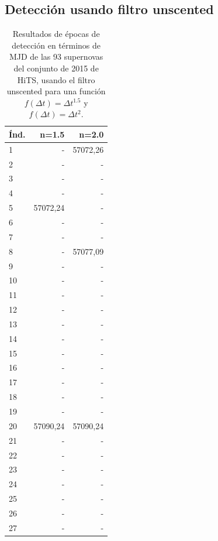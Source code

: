 \begin{appendix}
\section{Detecci\'on usando filtro unscented}
\begin{table}[h!]
\small
\centering
\caption{Resultados de \'epocas de detecci\'on en t\'erminos de MJD de las 93 supernovas del conjunto de 2015 de HiTS, usando el filtro unscented para una funci\'on $f(\Delta t) = \Delta t^{1.5}$ y $f(\Delta t) = \Delta t^{2}$.}

\begin{tabular}{|l|r|r|}
\hline
\textbf{\'Ind.} & \textbf{n=1.5}  & \textbf{n=2.0}  \\\hline
1     & -        & 57072,26 \\
2     & -        & -        \\
3     & -        & -        \\
4     & -        & -        \\
5     & 57072,24 & -        \\
6     & -        & -        \\
7     & -        & -        \\
8     & -        & 57077,09 \\
9     & -        & -        \\
10    & -        & -        \\
11    & -        & -        \\
12    & -        & -        \\
13    & -        & -        \\
14    & -        & -        \\
15    & -        & -        \\
16    & -        & -        \\
17    & -        & -        \\
18    & -        & -        \\
19    & -        & -        \\
20    & 57090,24 & 57090,24 \\
21    & -        & -        \\
22    & -        & -        \\
23    & -        & -        \\
24    & -        & -        \\
25    & -        & -        \\
26    & -        & -        \\
27    & -        & -        \\

\end{tabular}
\end{table}
\end{appendix}
